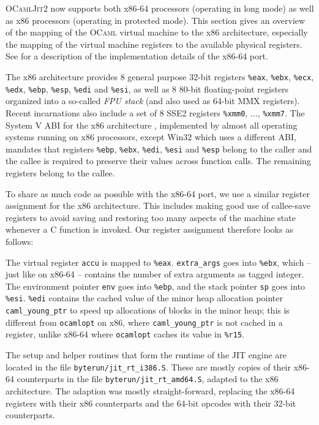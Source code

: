 \documentclass[12pt,a4paper,final]{article}
\begin{document}
\textsc{OCamlJit2} now supports both x86-64 processors (operating in long mode)
as well as x86 processors (operating in protected mode). This section gives an
overview of the mapping of the \textsc{OCaml} virtual machine to the x86
architecture, especially the mapping of the virtual machine registers to the available
physical registers. See \cite{Meurer10:OCamlJit2.0} for a description of the implementation
details of the x86-64 port.

The x86 architecture \cite{Intel10Vol1} provides $8$ general purpose 32-bit registers
\texttt{\%eax}, \texttt{\%ebx}, \texttt{\%ecx}, \texttt{\%edx}, \texttt{\%ebp}, \texttt{\%esp},
\texttt{\%edi} and \texttt{\%esi}, as well as $8$ 80-bit floating-point registers organized
into a so-called \emph{FPU stack} (and also used as 64-bit MMX registers). Recent incarnations also
include a set of $8$ SSE2 registers \texttt{\%xmm0}, $\ldots$, \texttt{\%xmm7}.
The System V ABI for the x86 architecture \cite{SCO97Abi386}, implemented by almost all
operating systems running on x86 processors, except Win32 which uses a different ABI,
mandates that registers \texttt{\%ebp}, \texttt{\%ebx}, \texttt{\%edi}, \texttt{\%esi}
and \texttt{\%esp} belong to the caller and the callee is required to preserve their
values across function calls. The remaining registers belong to the callee.

To share as much code as possible with the x86-64 port, we use a similar register assignment
for the x86 architecture. This includes making good use of callee-save registers to avoid
saving and restoring too many aspects of the machine state whenever a C function is
invoked. Our register assignment therefore looks as follows:

The virtual register \texttt{accu} is mapped to \texttt{\%eax}.
\texttt{extra\_args} goes into \texttt{\%ebx}, which -- just like on x86-64 -- contains
the number of extra arguments as tagged integer.
The environment pointer \texttt{env} goes into \texttt{\%ebp}, and
the stack pointer \texttt{sp} goes into \texttt{\%esi}.
\texttt{\%edi} contains the cached value of the minor heap allocation pointer
\texttt{caml\_young\_ptr} to speed up allocations of blocks in the minor heap; this
is different from \texttt{ocamlopt} on x86, where \texttt{caml\_young\_ptr} is not
cached in a register, unlike x86-64 where \texttt{ocamlopt} caches its value in \texttt{\%r15}.

The setup and helper routines that form the runtime of the JIT engine are located in the
file \texttt{byterun/jit\_rt\_i386.S}. These are mostly copies of their x86-64 counterparts
in the file \texttt{byterun/jit\_rt\_amd64.S}, adapted to the x86 architecture. The
adaption was mostly straight-forward, replacing the x86-64 registers with their x86
counterparts and the 64-bit opcodes with their 32-bit counterparts.
\end{document}
